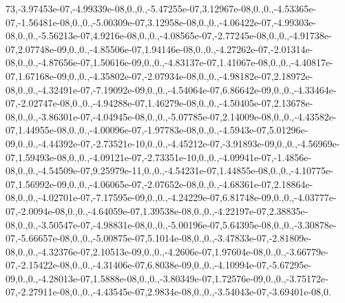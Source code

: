 {73,-\/3.\-97453e-\/07,-\/4.\-99339e-\/08,0.,0.,-\/5.\-47255e-\/07,3.\-12967e-\/08,0.,0.,-\/4.\-53365e-\/07,-\/1.\-56481e-\/08,0.,0.,-\/5.\-00309e-\/07,3.\-12958e-\/08,0.,0.,-\/4.\-06422e-\/07,-\/4.\-99303e-\/08,0.,0.,-\/5.\-56213e-\/07,4.\-9216e-\/08,0.,0.,-\/4.\-08565e-\/07,-\/2.\-77245e-\/08,0.,0.,-\/4.\-91738e-\/07,2.\-07748e-\/09,0.,0.,-\/4.\-85506e-\/07,1.\-94146e-\/08,0.,0.,-\/4.\-27262e-\/07,-\/2.\-01314e-\/08,0.,0.,-\/4.\-87656e-\/07,1.\-50616e-\/09,0.,0.,-\/4.\-83137e-\/07,1.\-41067e-\/08,0.,0.,-\/4.\-40817e-\/07,1.\-67168e-\/09,0.,0.,-\/4.\-35802e-\/07,-\/2.\-07934e-\/08,0.,0.,-\/4.\-98182e-\/07,2.\-18972e-\/08,0.,0.,-\/4.\-32491e-\/07,-\/7.\-19092e-\/09,0.,0.,-\/4.\-54064e-\/07,6.\-86642e-\/09,0.,0.,-\/4.\-33464e-\/07,-\/2.\-02747e-\/08,0.,0.,-\/4.\-94288e-\/07,1.\-46279e-\/08,0.,0.,-\/4.\-50405e-\/07,2.\-13678e-\/08,0.,0.,-\/3.\-86301e-\/07,-\/4.\-04945e-\/08,0.,0.,-\/5.\-07785e-\/07,2.\-14009e-\/08,0.,0.,-\/4.\-43582e-\/07,1.\-44955e-\/08,0.,0.,-\/4.\-00096e-\/07,-\/1.\-97783e-\/08,0.,0.,-\/4.\-5943e-\/07,5.\-01296e-\/09,0.,0.,-\/4.\-44392e-\/07,-\/2.\-73521e-\/10,0.,0.,-\/4.\-45212e-\/07,-\/3.\-91893e-\/09,0.,0.,-\/4.\-56969e-\/07,1.\-59493e-\/08,0.,0.,-\/4.\-09121e-\/07,-\/2.\-73351e-\/10,0.,0.,-\/4.\-09941e-\/07,-\/1.\-4856e-\/08,0.,0.,-\/4.\-54509e-\/07,9.\-25979e-\/11,0.,0.,-\/4.\-54231e-\/07,1.\-44855e-\/08,0.,0.,-\/4.\-10775e-\/07,1.\-56992e-\/09,0.,0.,-\/4.\-06065e-\/07,-\/2.\-07652e-\/08,0.,0.,-\/4.\-68361e-\/07,2.\-18864e-\/08,0.,0.,-\/4.\-02701e-\/07,-\/7.\-17595e-\/09,0.,0.,-\/4.\-24229e-\/07,6.\-81748e-\/09,0.,0.,-\/4.\-03777e-\/07,-\/2.\-0094e-\/08,0.,0.,-\/4.\-64059e-\/07,1.\-39538e-\/08,0.,0.,-\/4.\-22197e-\/07,2.\-38835e-\/08,0.,0.,-\/3.\-50547e-\/07,-\/4.\-98831e-\/08,0.,0.,-\/5.\-00196e-\/07,5.\-64395e-\/08,0.,0.,-\/3.\-30878e-\/07,-\/5.\-66657e-\/08,0.,0.,-\/5.\-00875e-\/07,5.\-1014e-\/08,0.,0.,-\/3.\-47833e-\/07,-\/2.\-81809e-\/08,0.,0.,-\/4.\-32376e-\/07,2.\-10513e-\/09,0.,0.,-\/4.\-2606e-\/07,1.\-97604e-\/08,0.,0.,-\/3.\-66779e-\/07,-\/2.\-15422e-\/08,0.,0.,-\/4.\-31406e-\/07,6.\-8038e-\/09,0.,0.,-\/4.\-10994e-\/07,-\/5.\-67295e-\/09,0.,0.,-\/4.\-28013e-\/07,1.\-5888e-\/08,0.,0.,-\/3.\-80349e-\/07,1.\-72576e-\/09,0.,0.,-\/3.\-75172e-\/07,-\/2.\-27911e-\/08,0.,0.,-\/4.\-43545e-\/07,2.\-9834e-\/08,0.,0.,-\/3.\-54043e-\/07,-\/3.\-69401e-\/08,0.}
